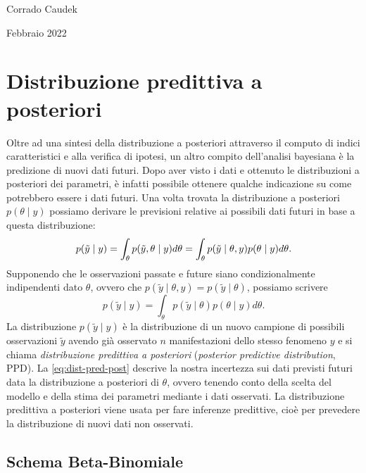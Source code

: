 \documentclass[
  10pt,
  italian,
  a4paper,
  extrafontsizes,onecolumn,openright
  ]{memoir}
\begin{document}
\bigskip

Corrado Caudek

\bigskip

Febbraio 2022

\mainmatter

\hypertarget{chapter-ppc}{%
\chapter{Distribuzione predittiva a posteriori}\label{chapter-ppc}}

Oltre ad una sintesi della distribuzione a posteriori attraverso il computo di indici caratteristici e alla verifica di ipotesi, un altro compito dell'analisi bayesiana è la predizione di nuovi dati futuri. Dopo aver visto i dati e ottenuto le distribuzioni a posteriori dei parametri, è infatti possibile ottenere qualche indicazione su come potrebbero essere i dati futuri. Una volta trovata la distribuzione a posteriori \(p(\theta \mid y)\) possiamo derivare le previsioni relative ai possibili dati futuri in base a questa distribuzione:
\begin{equation}
p(\tilde{y} \mid y) = \int_{\theta} p(\tilde{y}, \theta \mid y) d \theta = \int_{\theta} p(\tilde{y} \mid \theta, y) p(\theta \mid y) d\theta.\notag
\end{equation}
\noindent
Supponendo che le osservazioni passate e future siano condizionalmente indipendenti dato \(\theta\), ovvero che \(p(\tilde{y} \mid \theta, y) = p(\tilde{y} \mid \theta)\), possiamo scrivere
\begin{equation}
p(\tilde{y} \mid y) = \int_{\theta} p(\tilde{y} \mid \theta) p(\theta \mid y) d\theta.
\label{eq:dist-pred-post}
\end{equation}
\noindent
La distribuzione \(p(\tilde{y} \mid y)\) è la distribuzione di un nuovo campione di possibili osservazioni \(\tilde{y}\) avendo già osservato \(n\) manifestazioni dello stesso fenomeno \(y\) e si chiama \emph{distribuzione predittiva a posteriori} (\emph{posterior predictive distribution}, PPD). La \eqref{eq:dist-pred-post} descrive la nostra incertezza sui dati previsti futuri data la distribuzione a posteriori di \(\theta\), ovvero tenendo conto della scelta del modello e della stima dei parametri mediante i dati osservati. La distribuzione predittiva a posteriori viene usata per fare inferenze predittive, cioè per prevedere la distribuzione di nuovi dati non osservati.

\hypertarget{schema-beta-bin-distr-pred-post}{%
\section{Schema Beta-Binomiale}\label{schema-beta-bin-distr-pred-post}}
\end{document}
